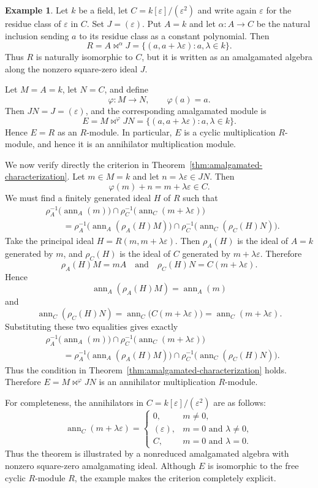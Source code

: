 \documentclass[11pt]{amsart}
\theoremstyle{plain}
\theoremstyle{definition}
\newtheorem{example}[theorem]{Example}
\theoremstyle{remark}
\newcommand{\ann}{\operatorname{ann}}
\numberwithin{equation}{section}
\begin{document}
\begin{example}
Let $k$ be a field, let $C=k[\varepsilon]/(\varepsilon^2)$ and write again $\varepsilon$ for the residue class of $\varepsilon$ in $C$. Set $J=(\varepsilon)$. Put $A=k$ and let
$\alpha:A\longrightarrow C$ be the natural inclusion sending $a$ to its residue class as a constant
polynomial. Then
\[
R=A\bowtie^\alpha J=\{(a,a+\lambda\varepsilon):a,\lambda\in k\}.
\]
Thus $R$ is naturally isomorphic to $C$, but it is written as an
amalgamated algebra along the nonzero square-zero ideal $J$.

Let $M=A=k$, let $N=C$, and define
\[
\varphi:M\longrightarrow N,\qquad \varphi(a)=a.
\]
Then $JN=J=(\varepsilon)$, and the corresponding amalgamated module is
\[
E=M\bowtie^\varphi JN = \{(a,a+\lambda\varepsilon):a,\lambda\in k\}.
\]
Hence $E=R$ as an $R$-module. In particular, $E$ is a cyclic multiplication
$R$-module, and hence it is an annihilator multiplication module.

We now verify directly the criterion in
Theorem~\ref{thm:amalgamated-characterization}. Let $m\in M=k$ and let
$n=\lambda\varepsilon\in JN$. Then
\[
    \varphi(m)+n=m+\lambda\varepsilon\in C.
\]
We must find a finitely generated ideal $H$ of $R$ such that
\[
\begin{aligned}
&\rho_A^{-1}\bigl(\ann_A(m)\bigr)
 \cap
 \rho_C^{-1}\bigl(\ann_C(m+\lambda\varepsilon)\bigr) \\
&\qquad =
\rho_A^{-1}\bigl(\ann_A(\rho_A(H)M)\bigr)
\cap
\rho_C^{-1}\bigl(\ann_C(\rho_C(H)N)\bigr).
\end{aligned}
\]
Take the principal ideal $H=R(m,m+\lambda\varepsilon).$
Then $\rho_A(H)$ is the ideal of $A=k$ generated by $m$, and $\rho_C(H)$ is
the ideal of $C$ generated by $m+\lambda\varepsilon$. Therefore
\[
    \rho_A(H)M=mA
    \quad\text{and}\quad
    \rho_C(H)N=C(m+\lambda\varepsilon).
\]
Hence
\[
    \ann_A(\rho_A(H)M)=\ann_A(m)
\]
and
\[
    \ann_C(\rho_C(H)N)
    =
    \ann_C\bigl(C(m+\lambda\varepsilon)\bigr)
    =
    \ann_C(m+\lambda\varepsilon).
\]
Substituting these two equalities gives exactly
\[
\begin{aligned}
&\rho_A^{-1}\bigl(\ann_A(m)\bigr)
 \cap
 \rho_C^{-1}\bigl(\ann_C(m+\lambda\varepsilon)\bigr) \\
&\qquad =
\rho_A^{-1}\bigl(\ann_A(\rho_A(H)M)\bigr)
\cap
\rho_C^{-1}\bigl(\ann_C(\rho_C(H)N)\bigr).
\end{aligned}
\]
Thus the condition in Theorem~\ref{thm:amalgamated-characterization} holds.
Therefore $E=M\bowtie^\varphi JN$ is an annihilator multiplication $R$-module.

For completeness, the annihilators in $C=k[\varepsilon]/(\varepsilon^2)$ are
as follows:
\[
\ann_C(m+\lambda\varepsilon)
=
\begin{cases}
0, & m\ne 0,\\
(\varepsilon), & m=0\text{ and }\lambda\ne 0,\\
C, & m=0\text{ and }\lambda=0.
\end{cases}
\]
Thus the theorem is illustrated by a nonreduced amalgamated algebra with
nonzero square-zero amalgamating ideal. Although $E$ is isomorphic to the free cyclic $R$-module $R$, the example makes
the criterion completely explicit.
\end{example}
\end{document}
